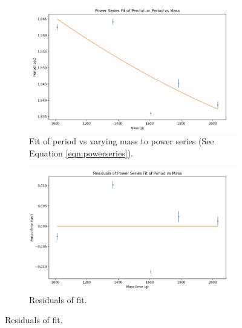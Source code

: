 \documentclass[12pt]{article}
\begin{document}
\begin{figure}[h]
    \centering
    \begin{subfigure}[b]{0.48\textwidth}
        \centering
        \includegraphics[width=\textwidth]{q4b_summaryfit.png}
        \caption{Fit of period vs varying mass to power series (See Equation \ref{eqn:powerseries}).}
        \label{fig:q4bfitsummary}
    \end{subfigure}
    \hfill
    \begin{subfigure}[b]{0.48\textwidth}
        \centering
        \includegraphics[width=\textwidth]{q4b_summaryresiduals.png}
        \caption{Residuals of fit.}
        \label{fig:q4bresidualssummary}
    \end{subfigure}
    \label{fig:q4bfigsummary}
\end{figure}
\pagebreak
\end{document}
